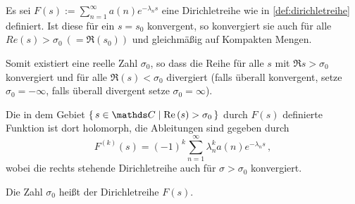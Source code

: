 \begin{satz}\label{satz:konvergenzDirichletreihen}
	Es sei $F(s) := \sum_{n=1}^\infty a(n) e^{-\lambda_n s}$ eine Dirichletreihe wie in \autoref{def:dirichletreihe} definiert.
	Ist diese für ein $s = s_0$ konvergent, so konvergiert sie auch für alle $Re(s) > \sigma_0\ (= \Re(s_0))$ und gleichmäßig auf Kompakten Mengen.
	
	Somit existiert eine reelle Zahl $\sigma_0$, so dass die Reihe für alle $s$ mit $\Re s > \sigma_0$ konvergiert und für alle $\Re(s) < \sigma_0$ divergiert (falls überall konvergent, setze $\sigma_0 = -\infty$, falls überall divergent setze $\sigma_0 = \infty$).
	
	Die in dem Gebiet $\Set{s \in \CC \mid \Re(s) > \sigma_0}$ durch $F(s)$ definierte Funktion ist dort holomorph, die Ableitungen sind gegeben durch
	\[
		F^{(k)}(s) = (-1)^k \sum_{n=1}^\infty \lambda_n^k a(n) e^{-\lambda_n s}\,,
	\]
	wobei die rechts stehende Dirichletreihe auch für $\sigma > \sigma_0$ konvergiert.
	
	Die Zahl $\sigma_0$ heißt  der Dirichletreihe $F(s)$.
\end{satz}

